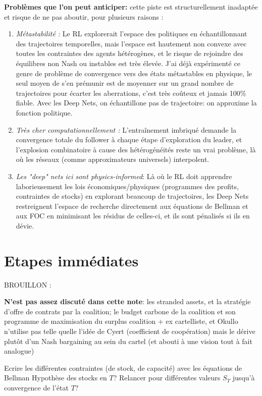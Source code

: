 \documentclass[11pt]{article}
\begin{document}
\textbf{Problèmes que l'on peut anticiper:} cette piste est structurellement inadaptée et risque de ne pas aboutir, pour plusieurs raisons :
\begin{enumerate}
    \item \emph{Métastabilité :} Le RL explorerait l'espace des politiques en échantillonnant des trajectoires temporelles, mais l'espace est hautement non convexe avec toutes les contraintes des agents hétérogènes, et le risque de rejoindre des équilibres non Nash ou instables est très élevée. J'ai déjà expérimenté ce genre de problème de convergence vers des états métastables en physique, le seul moyen de s'en prémunir est de moyenner sur un grand nombre de trajectoires pour écarter les aberrations, c'est très coûteux et jamais 100\% fiable. Avec les Deep Nets, on échantillone pas de trajectoire: on approxime la fonction politique. 
    \item \emph{Très cher computationnellement :} L'entraînement imbriqué demande la convergence totale du follower à chaque étape d'exploration du leader, et l'explosion combinatoire à cause des hétérogénéités reste un vrai problème, là où les réseaux (comme approximateurs universels) interpolent. 
    \item \emph{Les "deep" nets ici sont physics-informed}:  Là où le RL doit apprendre laborieusement les lois économiques/physiques (programmes des profits, contraintes de stocks) en explorant beaucoup de trajectoires, les Deep Nets restreignent l'espace de recherche directement aux équations de Bellman et aux FOC en minimisant les résidus de celles-ci, et ils sont pénalisés si ils en dévie.
\end{enumerate}
\section{Etapes immédiates}

BROUILLON : 

\textbf{N'est pas assez discuté dans cette note}: les stranded assets, et la stratégie d'offre de contrats par la coalition; le budget carbone de la coalition et son programme de maximisation du surplus coalition + ex cartelliste, et Okullo n'utilise pas telle quelle l'idée de Cyert (coefficient de coopération) mais le dérive plutôt d'un Nash bargaining au sein du cartel (et abouti à une vision tout à fait analogue) 

Ecrire les différentes contraintes (de stock, de capacité) avec les équations de Bellman
Hypothèse des stocks en $T$?
Relancer pour différentes valeurs $S_T$ jusqu'à convergence de l'état $T$?
\end{document}
